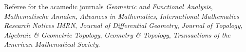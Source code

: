 

Referee for the acamedic journals \textit{Geometric and Functional Analysis}, \textit{Mathematische Annalen}, \textit{Advances in Mathematics}, \textit{International Mathematics Research Notices IMRN}, \textit{Journal of Differential Geometry}, \textit{Journal of Topology}, \textit{Algebraic \& Geometric Topology}, \textit{Geometry \& Topology}, \textit{Transactions of the American Mathematical Society}.

%

